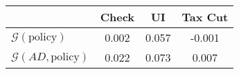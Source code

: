 \begin{tabular}{@{}lccc@{}} 
\toprule 
                          & Check      & UI    & Tax Cut    \\  \midrule 
$\mathcal{G}(\text{policy})$ & 0.002  & 0.057  & -0.001     \\ 
$\mathcal{G}(AD,\text{policy})$ & 0.022  & 0.073  & 0.007     \\ 
\end{tabular}  
